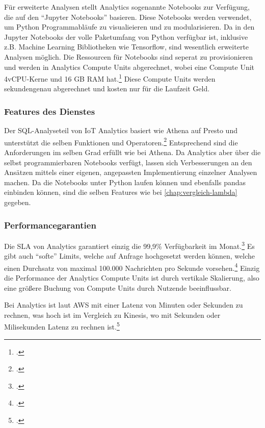 Für erweiterte Analysen stellt \AWSIOT{} Analytics sogenannte Notebooks zur Verfügung, die auf den \enquote{Jupyter Notebooks} basieren. Diese Notebooks werden verwendet, um Python Programmabläufe zu visualieieren und zu modularisieren. Da in den Jupyter Notebooks der volle Paketumfang von Python verfügbar ist, inklusive z.B. Machine Learning Bibliotheken wie Tensorflow, sind wesentlich erweiterte Analysen möglich. Die Ressourcen für Notebooks sind seperat zu provisionieren und werden in Analytics Compute Units abgerechnet, wobei eine Compute Unit 4vCPU-Kerne und 16 GB \ac{RAM} hat.\footcite[Vgl.][]{AmazonWebServicesInc..o.J.i} Diese Compute Units werden sekundengenau abgerechnet und kosten nur für die Laufzeit Geld.

\subsubsection{Features des Dienstes}
Der \ac{SQL}-Analyseteil von IoT Analytics basiert wie Athena auf Presto und unterstützt die selben Funktionen und Operatoren.\footcite[Vgl.][]{AmazonWebServicesInc..o.J.au} Entsprechend sind die Anforderungen im selben Grad erfüllt wie bei Athena. Da \AWSIOT{} Analytics aber über die selbst programmierbaren Notebooks verfügt, lassen sich Verbesserungen an den Ansätzen mittels einer eigenen, angepassten Implementierung einzelner Analysen machen.
Da die Notebooks unter Python laufen können und ebenfalls pandas einbinden können, sind die selben Features wie bei \autoref{chap:vergleich-lambda} gegeben.

\subsubsection{Performancegarantien}
Die \ac{SLA} von \AWSIOT{} Analytics garantiert einzig die 99,9\% Verfügbarkeit im Monat.\footcite[Vgl.][]{AmazonWebServicesInc..2019f} Es gibt auch \enquote{softe} Limits, welche auf Anfrage hochgesetzt werden können, welche einen Durchsatz von maximal 100.000 Nachrichten pro Sekunde vorsehen.\footcite[Vgl][]{AmazonWebServicesInc..o.J.av} Einzig die Performance der Analytics Compute Units ist durch vertikale Skalierung, also eine größere Buchung von Compute Units durch Nutzende beeinflussbar.

Bei \AWSIOT{} Analytics ist laut \ac{AWS} mit einer Latenz von Minuten oder Sekunden zu rechnen, was hoch ist im Vergleich zu Kinesis, wo mit Sekunden oder Milisekunden Latenz zu rechnen ist.\footcite[Vgl.][]{AmazonWebServicesInc..o.J.ax}

